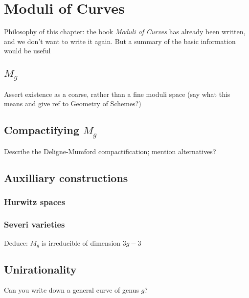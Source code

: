 

\chapter{Moduli of Curves}
\label{Moduli chapter}

Philosophy of this chapter: the book \emph{Moduli of Curves} has already been written, and we don't want to write it again. But a summary of the basic information would be useful

\section{$M_g$}

Assert existence as a coarse, rather than a fine moduli space (say what this means and give ref to Geometry of Schemes?)

\section{Compactifying $M_g$}

Describe the Deligne-Mumford compactification; mention alternatives?

\section{Auxilliary constructions}

\subsection{Hurwitz spaces}

\subsection{Severi varieties}

Deduce: $M_g$ is irreducible of dimension $3g-3$

\section{Unirationality}

Can you write down a general curve of genus $g$?

